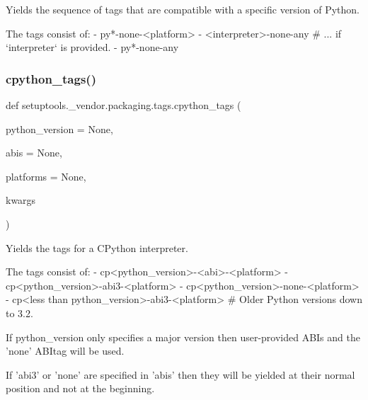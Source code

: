 \begin{DoxyVerb}Yields the sequence of tags that are compatible with a specific version of Python.

The tags consist of:
- py*-none-<platform>
- <interpreter>-none-any  # ... if `interpreter` is provided.
- py*-none-any
\end{DoxyVerb}
 \mbox{\label{namespacesetuptools_1_1__vendor_1_1packaging_1_1tags_ab5791389704aaa4bea021d3e094bb8a7}} 
\subsubsection{\texorpdfstring{cpython\+\_\+tags()}{cpython\_tags()}}
{\footnotesize\ttfamily def setuptools.\+\_\+vendor.\+packaging.\+tags.\+cpython\+\_\+tags (\begin{DoxyParamCaption}\item[{}]{python\+\_\+version = {\ttfamily None},  }\item[{}]{abis = {\ttfamily None},  }\item[{}]{platforms = {\ttfamily None},  }\item[{}]{kwargs }\end{DoxyParamCaption})}

\begin{DoxyVerb}Yields the tags for a CPython interpreter.

The tags consist of:
- cp<python_version>-<abi>-<platform>
- cp<python_version>-abi3-<platform>
- cp<python_version>-none-<platform>
- cp<less than python_version>-abi3-<platform>  # Older Python versions down to 3.2.

If python_version only specifies a major version then user-provided ABIs and
the 'none' ABItag will be used.

If 'abi3' or 'none' are specified in 'abis' then they will be yielded at
their normal position and not at the beginning.
\end{DoxyVerb}
 \mbox{\label{namespacesetuptools_1_1__vendor_1_1packaging_1_1tags_a5bdf286a77df0f298ed224fb44c32487}} 
